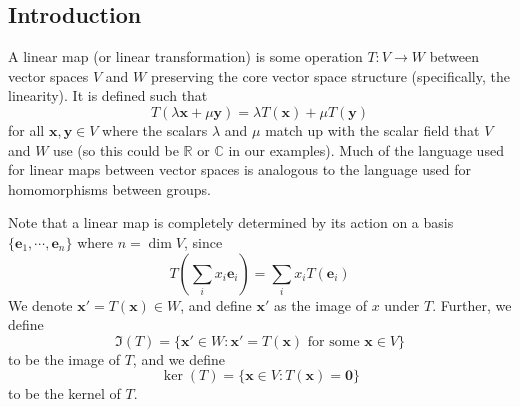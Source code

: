 \documentclass{article}
\begin{document}
	\subsection{Introduction}
	A linear map (or linear transformation) is some operation $T: V \to W$ between vector spaces $V$ and $W$ preserving the core vector space structure (specifically, the linearity). It is defined such that
	\[ T\left(\lambda \bm x + \mu \bm y\right) = \lambda T(\bm x) + \mu T(\bm y) \]
	for all $\bm x, \bm y \in V$ where the scalars $\lambda$ and $\mu$ match up with the scalar field that $V$ and $W$ use (so this could be $\mathbb R$ or $\mathbb C$ in our examples). Much of the language used for linear maps between vector spaces is analogous to the language used for homomorphisms between groups.

	Note that a linear map is completely determined by its action on a basis $\{ \bm e_1, \cdots, \bm e_n \}$ where $n = \dim V$, since
	\[ T\left(\sum_i x_i \bm e_i \right) = \sum_i x_i T(\bm e_i) \]
	We denote $\bm x' = T(\bm x) \in W$, and define $\bm x'$ as the image of $x$ under $T$. Further, we define
	\[ \Im (T) = \{ \bm x' \in W : \bm x' =T(\bm x) \text{ for some } \bm x \in V \} \]
	to be the image of $T$, and we define
	\[ \ker (T) = \{ \bm x \in V : T(\bm x) = \bm 0 \} \]
	to be the kernel of $T$.
\end{document}
